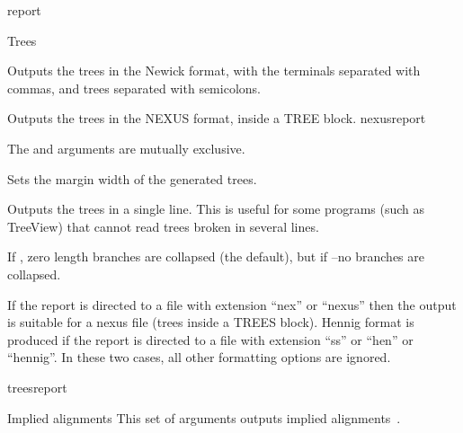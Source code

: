 \begin{command}{report}{}
\begin{arguments}
\begin{argumentgroup}{Trees}
{\begin{description}
                        {Outputs the trees in the Newick format, with the
                        terminals separated with commas, and trees separated
                        with semicolons.}
                        {}
                        
                        {Outputs the trees in the NEXUS format, inside a TREE block.}
                        {nexusreport}
                    
                    \begin{statement}
                     The  and  arguments are 
                     mutually exclusive.
                     \end{statement}
	     
                        {Sets the margin width of the generated trees.}
                        {}

                        {Outputs the trees in a single line. This is useful for
                        some programs (such as TreeView) that cannot read
                        trees broken in several
                        lines.}
                        {}

                        {If , zero length branches are collapsed (the
                        default), but if --no branches are
                        collapsed.}
                        {}
                    \end{description}
                If the report is directed
                to a file with extension ``nex'' or ``nexus'' then
                the output is suitable for a nexus file (trees inside a TREES
                block). Hennig format is produced if the report is directed
                to a file with extension ``ss'' or ``hen'' or ``hennig''. In
                these two cases, all other formatting options are ignored.}
                {treesreport}

		\end{argumentgroup}

		\begin{argumentgroup}{Implied alignments}
            {This set of arguments outputs implied alignments~\cite{wheeler2003}.} 


\end{argumentgroup}
\end{arguments}
\end{command}
